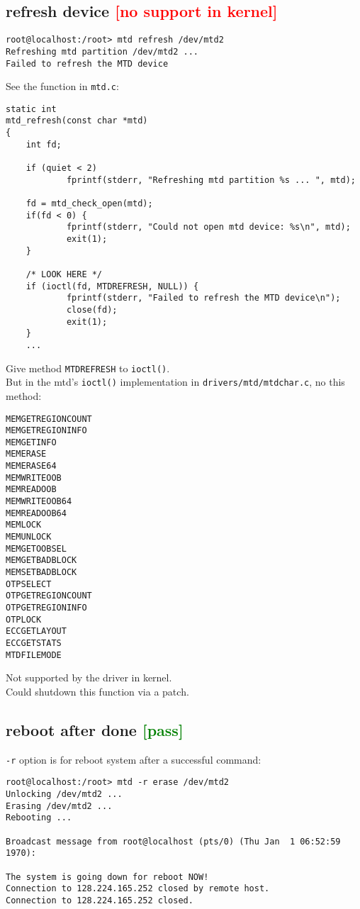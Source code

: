 \documentclass[a4paper]{report}
\begin{document}
\subsection{refresh device \textcolor{red}{[no support in kernel]}}
\begin{lstlisting}
root@localhost:/root> mtd refresh /dev/mtd2
Refreshing mtd partition /dev/mtd2 ... 
Failed to refresh the MTD device
\end{lstlisting}
See the function in {\tt mtd.c}:
\begin{lstlisting}
static int
mtd_refresh(const char *mtd)
{
    int fd;

    if (quiet < 2)
            fprintf(stderr, "Refreshing mtd partition %s ... ", mtd);

    fd = mtd_check_open(mtd);
    if(fd < 0) {
            fprintf(stderr, "Could not open mtd device: %s\n", mtd);
            exit(1);
    }

    /* LOOK HERE */
    if (ioctl(fd, MTDREFRESH, NULL)) {              
            fprintf(stderr, "Failed to refresh the MTD device\n");
            close(fd);
            exit(1);
    }
    ...

\end{lstlisting}
Give method {\tt MTDREFRESH} to {\tt ioctl()}.\\
But in the mtd's {\tt ioctl()} implementation in {\tt drivers/mtd/mtdchar.c}, 
no this method:
\begin{lstlisting}
MEMGETREGIONCOUNT
MEMGETREGIONINFO
MEMGETINFO
MEMERASE
MEMERASE64
MEMWRITEOOB
MEMREADOOB
MEMWRITEOOB64
MEMREADOOB64
MEMLOCK
MEMUNLOCK
MEMGETOOBSEL
MEMGETBADBLOCK
MEMSETBADBLOCK
OTPSELECT
OTPGETREGIONCOUNT
OTPGETREGIONINFO
OTPLOCK
ECCGETLAYOUT
ECCGETSTATS
MTDFILEMODE
\end{lstlisting}
Not supported by the driver in kernel.\\
Could shutdown this function via a patch.
\subsection{reboot after done \textcolor{green}{[pass]}}
{\tt -r} option is for reboot system after a successful command:
\begin{lstlisting}
root@localhost:/root> mtd -r erase /dev/mtd2
Unlocking /dev/mtd2 ...
Erasing /dev/mtd2 ...
Rebooting ...

Broadcast message from root@localhost (pts/0) (Thu Jan  1 06:52:59 1970):

The system is going down for reboot NOW!
Connection to 128.224.165.252 closed by remote host.
Connection to 128.224.165.252 closed.
\end{lstlisting}
\end{document}
